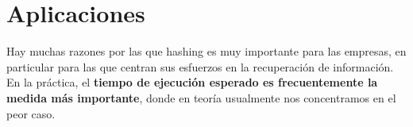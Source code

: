 \begin{comment}
    
\subsection{Análisis de costo }
Asumir que el diccionario contiene $n$ entradas, la tabla tiene la capacidad $m$. Las colisiones son resueltas usando encadenamiento. ¿Cuál es el costo de \textbf{buscar} e \textbf{insertar}? Observar que el costo de \textbf{insertar} es al menos lo que cuesta \textbf{buscar}. Pues necesitamos chequear si una entrada con esa clave ya está en el diccionario. 

\end{comment}


\section{Aplicaciones}


Hay muchas razones por las que hashing es muy importante para las empresas, en particular para las que centran sus esfuerzos en la recuperación de información. En la práctica, el \textbf{tiempo de ejecución esperado es frecuentemente la medida más importante}, donde en teoría usualmente nos concentramos en el peor caso. 


